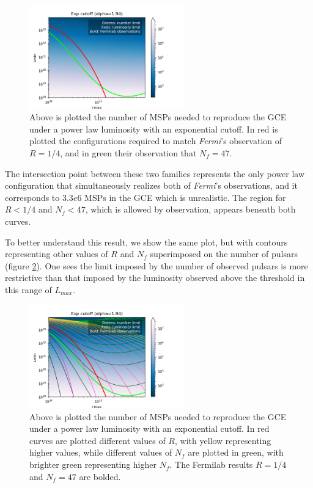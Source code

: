 \documentclass{C://Aliases//Dropbox-MIT//Latex_Templates//personal}
\begin{document}
\begin{figure}[h]
    \label{contour-overlay-power-law}
    \centering
    \includegraphics[width=0.6\textwidth]{../../luminosity-models/power-law/contour-overlay.png}
    \caption{Above is plotted the number of MSPs needed to reproduce the GCE under a power law luminosity with an exponential cutoff. In red is plotted the configurations required to match \textit{Fermi}'s observation of $R=1/4$, and in green their observation that $N_f = 47$. }
\end{figure}

The intersection point between these two families represents the only power law configuration that simultaneously realizes both of \textit{Fermi}'s observations, and it corresponds to $\si{3.3e6}$ MSPs in the GCE which is unrealistic. The region for $R < 1/4$ and $N_f < 47$, which is allowed by observation, appears beneath both curves.

To better understand this result, we show the same plot, but with contours representing other values of $R$ and $N_f$ superimposed on the number of pulsars (figure \ref{contour-overlay-extra-power-law}). One sees the limit imposed by the number of observed pulsars is more restrictive than that imposed by the luminosity observed above the threshold in this range of $L_{max}$.

\begin{figure}[h]
    \label{contour-overlay-extra-power-law}
    \centering
    \includegraphics[width=0.6\textwidth]{../../luminosity-models/power-law/contour-overlay-extra.png}
    \caption{Above is plotted the number of MSPs needed to reproduce the GCE under a power law luminosity with an exponential cutoff. In red curves are plotted different values of $R$, with yellow representing higher values, while different values of $N_f$ are plotted in green, with brighter green representing higher $N_f$. The Fermilab results $R=1/4$ and $N_f=47$ are bolded.}
\end{figure}
\end{document}
